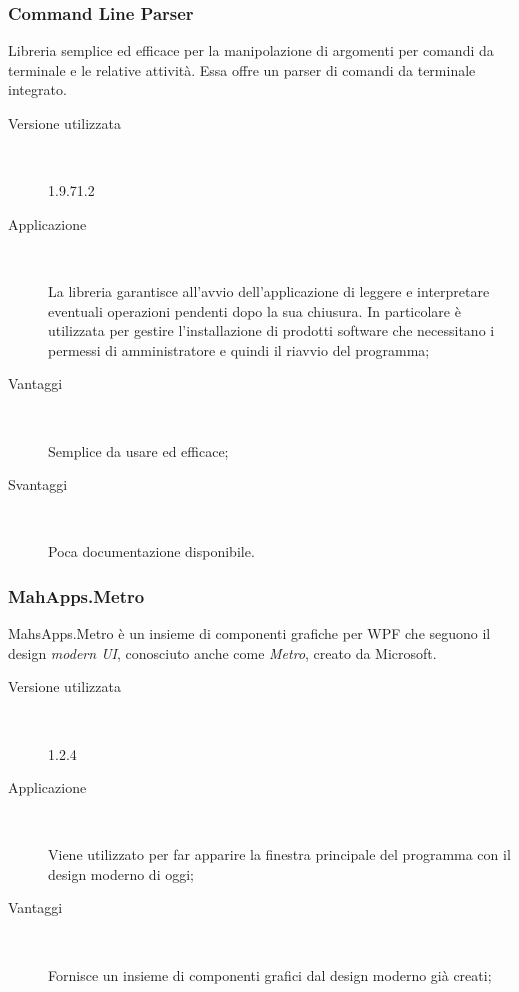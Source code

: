 \documentclass[../RelazioneFinale.tex]{subfiles}
\begin{document}
			\subsubsection{Command Line Parser}
				Libreria semplice ed efficace per la manipolazione di argomenti per comandi da terminale e le relative attività. Essa offre un parser di comandi da terminale integrato.
				\begin{description}
					\item[Versione utilizzata] \ \par 
					1.9.71.2 
					\item[Applicazione] \ \par
					La libreria garantisce all'avvio dell'applicazione di leggere e interpretare eventuali operazioni pendenti dopo la sua chiusura. In particolare è utilizzata per gestire l'installazione di prodotti software che necessitano i permessi di amministratore e quindi il riavvio del programma;
					\item[Vantaggi] \ \par
					Semplice da usare ed efficace;
					\item[Svantaggi] \ \par
					Poca documentazione disponibile.
				\end{description}
			
			\subsubsection{MahApps.Metro}
				MahsApps.Metro è un insieme di componenti grafiche per WPF che seguono il design \emph{modern UI}, conosciuto anche come \emph{Metro}, creato da Microsoft.
				\begin{description}
					\item[Versione utilizzata] \ \par 
					1.2.4
					\item[Applicazione] \ \par
					Viene utilizzato per far apparire la finestra principale del programma con il design moderno di oggi;
					\item[Vantaggi] \ \par
					Fornisce un insieme di componenti grafici dal design moderno già creati;
				\end{description}
			
\end{document}
